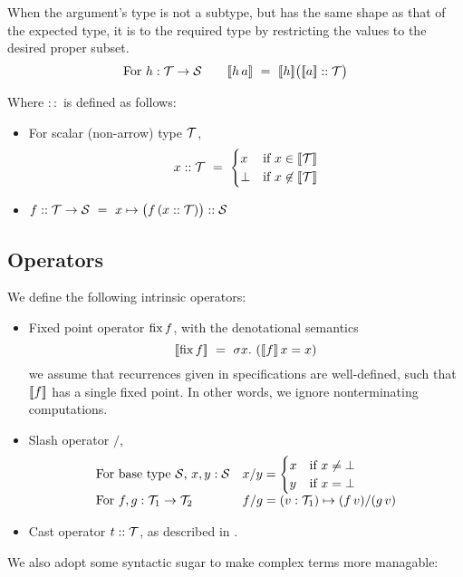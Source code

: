 When the argument's type is not a subtype, but has the same shape as that of the expected type,
it is  to the required type by restricting the values to the desired proper subset.
%
\[\mbox{For }h:\mathcal{T}\to\mathcal{S} \qquad [\![{h\,a}]\!] ~=~ [\![{h}]\!]\big([\![{a}]\!] :: \mathcal{T}\big)\]

Where $::$ is defined as follows:
\begin{itemize}
  \item For scalar (non-arrow) type $\mathcal{T}$, \[x :: \mathcal{T} ~=~ \begin{cases}x & \mbox{if }x\in[\![{\mathcal{T}}]\!] \\ \bot & \mbox{if }x\not\in[\![{\mathcal{T}}]\!]\end{cases}\]
  \item $f :: \mathcal{T}\to\mathcal{S} ~=~ x\mapsto \big(f\,(x :: \mathcal{T})\big) :: \mathcal{S}$
\end{itemize}

\subsection{Operators}
\label{lang:operators}

\newcommand\applt{\textrm{{\scriptsize\,}\guillemotright{\scriptsize\,}}}

We define the following intrinsic operators:

\begin{itemize}
  \item Fixed point operator $\operatorname{fix} f$, with the denotational semantics
    \[[\![{\operatorname{fix} f}]\!] ~=~ \sigma x.~ ([\![{f}]\!]\,x=x)\]
  we assume that recurrences given in specifications are well-defined, 
  such that $[\![{f}]\!]$ has a single fixed point.
  In other words, we ignore nonterminating computations.
  \item Slash operator $/$,
  \[\begin{array}{ll}
      \mbox{For base type $\mathcal{S}$, $x,y:\mathcal{S}$} & x/y = \begin{cases}x & \mbox{if }x\neq\bot \\ y & \mbox{if }x=\bot\end{cases} \\
      \mbox{For $f,g:\mathcal{T}_1\to\mathcal{T}_2$} & f/g = (v:\mathcal{T}_1)\mapsto (f\,v)/(g\,v)
    \end{array}\]
  \item Cast operator $t :: \mathcal{T}$, as described in .
\end{itemize}

We also adopt some syntactic sugar to make complex terms more managable:

